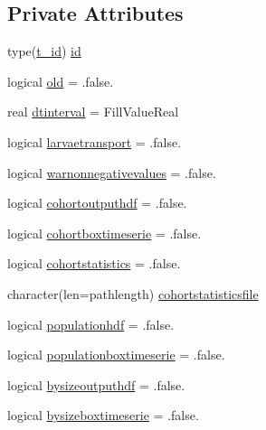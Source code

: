 \subsection*{Private Attributes}
\begin{DoxyCompactItemize}
\item 
type(\mbox{\hyperlink{structmodulewaterproperties_1_1t__id}{t\+\_\+id}}) \mbox{\hyperlink{structmodulewaterproperties_1_1t__species_a0107de7d2bc45845e89ce030a2845151}{id}}
\item 
logical \mbox{\hyperlink{structmodulewaterproperties_1_1t__species_a9de2fa306c10692e5ebb0856b0849673}{old}} = .false.
\item 
real \mbox{\hyperlink{structmodulewaterproperties_1_1t__species_a19909437377dd2a392bae21519a93e23}{dtinterval}} = Fill\+Value\+Real
\item 
logical \mbox{\hyperlink{structmodulewaterproperties_1_1t__species_ab47198081a448e1da90dc8843755c021}{larvaetransport}} = .false.
\item 
logical \mbox{\hyperlink{structmodulewaterproperties_1_1t__species_a6bb1e645b82e348b95780216b2410fc4}{warnonnegativevalues}} = .false.
\item 
logical \mbox{\hyperlink{structmodulewaterproperties_1_1t__species_ab08f32cf41a00416a965eef72fc9465d}{cohortoutputhdf}} = .false.
\item 
logical \mbox{\hyperlink{structmodulewaterproperties_1_1t__species_a71e0fbb787e977b064d2bd2a5368b3c3}{cohortboxtimeserie}} = .false.
\item 
logical \mbox{\hyperlink{structmodulewaterproperties_1_1t__species_a510e93ee790c2ca741359d7b004afd28}{cohortstatistics}} = .false.
\item 
character(len=pathlength) \mbox{\hyperlink{structmodulewaterproperties_1_1t__species_a91e001f7cb044aed4c85c108b7379067}{cohortstatisticsfile}}
\item 
logical \mbox{\hyperlink{structmodulewaterproperties_1_1t__species_a231ca52ee8f510d400c7bb53731421b1}{populationhdf}} = .false.
\item 
logical \mbox{\hyperlink{structmodulewaterproperties_1_1t__species_adfa4da631e75b52f83e45791139f3144}{populationboxtimeserie}} = .false.
\item 
logical \mbox{\hyperlink{structmodulewaterproperties_1_1t__species_a3b489e5a3d980efb766d4da79262cb16}{bysizeoutputhdf}} = .false.
\item 
logical \mbox{\hyperlink{structmodulewaterproperties_1_1t__species_a46a8cb457191e90de750642c7177d7cf}{bysizeboxtimeserie}} = .false.

\end{DoxyCompactItemize}
